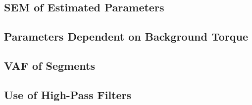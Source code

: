 \documentclass[11pt,a4paper]{article}
\begin{document}
\subsection{SEM of Estimated Parameters}

\subsection{Parameters Dependent on Background Torque}

\subsection{VAF of Segments}

\subsection{Use of High-Pass Filters}
\end{document}
